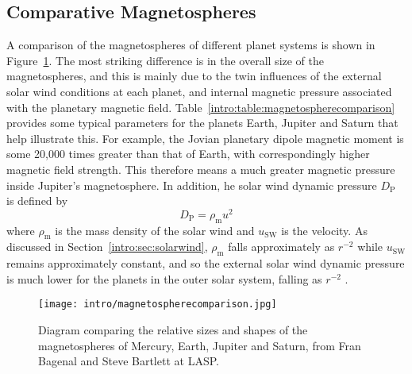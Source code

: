 \subsection{Comparative Magnetospheres}\label{intro:sec:comparativemagnetospheres}
A comparison of the magnetospheres of different planet systems is shown in Figure~\ref{intro:fig:magnetospherecomparison}. The most striking difference is in the overall size of the magnetospheres, and this is mainly due to the twin influences of the external solar wind conditions at each planet, and internal magnetic pressure associated with the planetary magnetic field. Table~\ref{intro:table:magnetospherecomparison} provides some typical parameters for the planets Earth, Jupiter and Saturn that help illustrate this. For example, the Jovian planetary dipole magnetic moment is some 20,000 times greater than that of Earth, with correspondingly higher magnetic field strength. This therefore means a much greater magnetic pressure inside Jupiter's magnetosphere. In addition, he solar wind dynamic pressure $D_\mathrm{P}$ is defined by 
\begin{equation}\label{intro:eq:dp}
D_\mathrm{P} = \rho_\mathrm{m}u^2
\end{equation}
where $\rho_\mathrm{m}$ is the mass density of the solar wind and $u_\mathrm{SW}$ is the velocity. As discussed in Section~\ref{intro:sec:solarwind}, $\rho_\mathrm{m}$ falls approximately as $r^{-2}$ while $u_\mathrm{SW}$ remains approximately constant, and so the external solar wind dynamic pressure is much lower for the planets in the outer solar system, falling as $r^{-2}$ .
\begin{figure}
\centering
\noindent\texttt{[image: intro/magnetospherecomparison.jpg]}
\caption[Diagram of Mercury, Earth, Jupiter and Saturn magnetospheres.]{Diagram comparing the relative sizes and shapes of the magnetospheres of Mercury, Earth, Jupiter and Saturn, from Fran Bagenal and Steve Bartlett at LASP.}
\label{intro:fig:magnetospherecomparison}
\end{figure}
